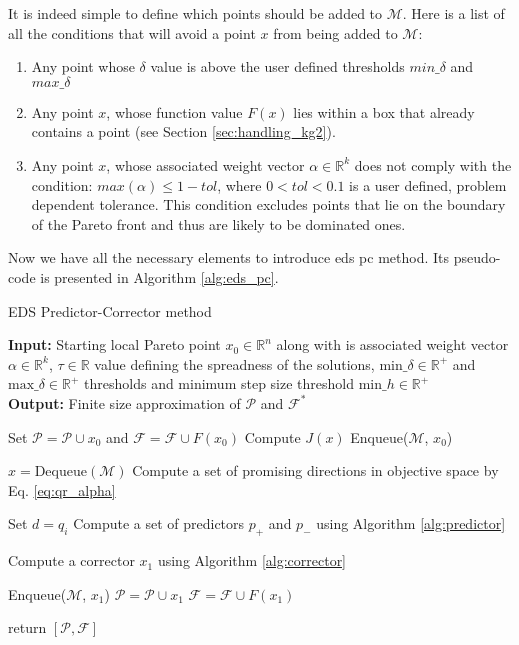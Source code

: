 It is indeed simple to define which points should be added to $\mathcal{M}$. Here is a list of all the conditions that will avoid a point $x$ from being added to $\mathcal{M}$:

\begin{enumerate}
\item Any point whose $\delta$ value is above the user defined thresholds $min\_\delta$ and $max\_\delta$ 
\item Any point $x$, whose function value $F(x)$ lies within a box that already contains a point (see Section \ref{sec:handling_kg2}).
\item Any point $x$, whose associated weight vector $\alpha \in \mathbb{R}^k$ does not comply with the condition: $max(\alpha) \leq 1 - tol$, where $0 < tol < 0.1$ is a user defined, problem dependent tolerance. This condition excludes points that lie on the boundary of the Pareto front and thus are likely to be dominated ones.
\end{enumerate}

Now we have all the necessary elements to introduce \gls{eds} \gls{pc} method. Its pseudo-code is presented in Algorithm \ref{alg:eds_pc}. 

\begin{algorithm}[H]
\caption{EDS Predictor-Corrector method}\label{alg:eds_pc}
\textbf{Input:} Starting local Pareto point $x_0 \in \mathbb{R}^n$ along with is associated weight vector $\alpha \in \mathbb{R}^k$, $\tau \in \mathbb{R}$ value defining the spreadness of the solutions, $\text{min\_}\delta \in \mathbb{R}^+$ and $\text{max\_}\delta \in \mathbb{R}^+$ thresholds and minimum step size threshold $\text{min\_}h \in \mathbb{R}^+$\\
\textbf{Output:} Finite size approximation of $\mathcal{P}$ and $\mathcal{F}^*$
	\begin{algorithmic}[1]
	
	\State Set $\mathcal{P} = \mathcal{P} \cup x_0$ and $\mathcal{F} = \mathcal{F} \cup F(x_0)$
	\State Compute $J(x)$
	\State Enqueue($\mathcal{M}$, $x_0$)
	
			
		\State $x = \text{Dequeue}(\mathcal{M})$	
		\State Compute a set of promising directions in objective space by Eq. \eqref{eq:qr_alpha}
		
			\State Set $d = q_i$
			\State Compute a set of predictors $p_+$ and $p_-$ using Algorithm \ref{alg:predictor}
			
				\State Compute a corrector $x_1$ using Algorithm \ref{alg:corrector}			
				
					\State Enqueue($\mathcal{M}$, $x_1$)
					\State $\mathcal{P} = \mathcal{P} \cup x_1$
					\State $\mathcal{F} = \mathcal{F} \cup F(x_1)$
					
				\EndIf
			\EndFor
		
		\EndFor		
		
	\EndWhile
	
	\State return $[\mathcal{P}, \mathcal{F}]$   
	\end{algorithmic}
\end{algorithm}

